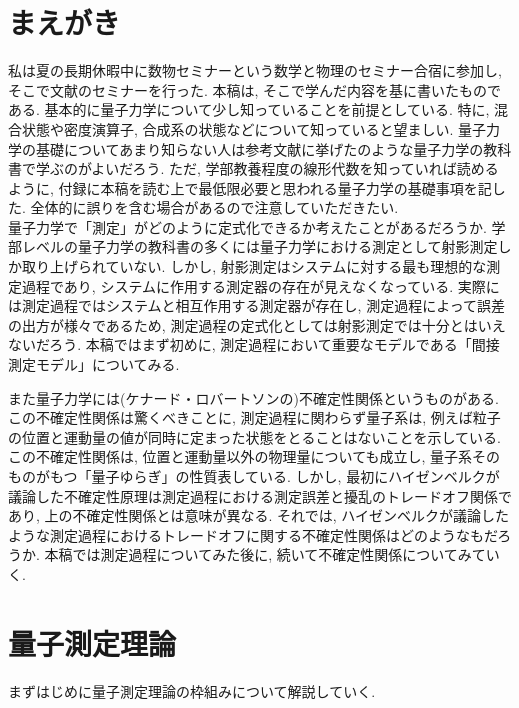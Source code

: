 %


%

\section{まえがき}
私は夏の長期休暇中に数物セミナーという数学と物理のセミナー合宿に参加し, そこで文献\cite{sagawaueda}のセミナーを行った. 本稿は, そこで学んだ内容を基に書いたものである. 基本的に量子力学について少し知っていることを前提としている. 特に, 混合状態や密度演算子, 合成系の状態などについて知っていると望ましい. 量子力学の基礎についてあまり知らない人は参考文献に挙げた\cite{simizu}のような量子力学の教科書で学ぶのがよいだろう.  
ただ, 学部教養程度の線形代数を知っていれば読めるように, 付録に本稿を読む上で最低限必要と思われる量子力学の基礎事項を記した. 全体的に誤りを含む場合があるので注意していただきたい. 
\\

量子力学で「測定」がどのように定式化できるか考えたことがあるだろうか. 学部レベルの量子力学の教科書の多くには量子力学における測定として射影測定しか取り上げられていない. しかし, 射影測定はシステムに対する最も理想的な測定過程であり, システムに作用する測定器の存在が見えなくなっている. 実際には測定過程ではシステムと相互作用する測定器が存在し, 測定過程によって誤差の出方が様々であるため, 測定過程の定式化としては射影測定では十分とはいえないだろう. 本稿ではまず初めに, 測定過程において重要なモデルである「間接測定モデル」についてみる. 

また量子力学には(ケナード・ロバートソンの)不確定性関係というものがある. この不確定性関係は驚くべきことに, 測定過程に関わらず量子系は, 例えば粒子の位置と運動量の値が同時に定まった状態をとることはないことを示している. この不確定性関係は, 位置と運動量以外の物理量についても成立し, 量子系そのものがもつ「量子ゆらぎ」の性質表している. しかし, 最初にハイゼンベルクが議論した不確定性原理は測定過程における測定誤差と擾乱のトレードオフ関係であり, 上の不確定性関係とは意味が異なる. それでは, ハイゼンベルクが議論したような測定過程におけるトレードオフに関する不確定性関係はどのようなもだろうか. 本稿では測定過程についてみた後に, 続いて不確定性関係についてみていく.

\section{量子測定理論}
まずはじめに量子測定理論の枠組みについて解説していく.
